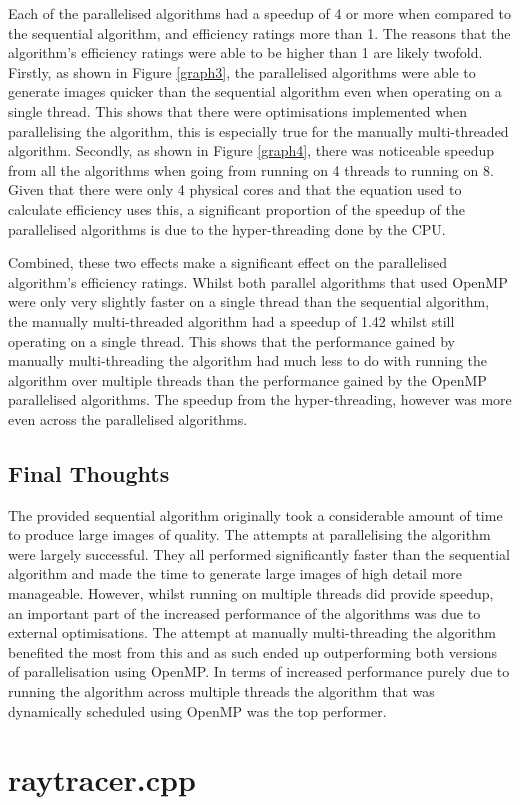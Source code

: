 \documentclass[12pt,journal,transmag]{IEEEtran}
\begin{document}
	Each of the parallelised algorithms had a speedup of 4 or more when compared to the sequential algorithm, and efficiency ratings more than 1. The reasons that the algorithm's efficiency ratings were able to be higher than 1 are likely twofold. Firstly, as shown in Figure \ref{graph3}, the parallelised algorithms were able to generate images quicker than the sequential algorithm even when operating on a single thread. This shows that there were optimisations implemented when parallelising the algorithm, this is especially true for the manually multi-threaded algorithm. Secondly, as shown in Figure \ref{graph4}, there was noticeable speedup from all the algorithms when going from running on 4 threads to running on 8. Given that there were only 4 physical cores and that the equation used to calculate efficiency uses this, a significant proportion of the speedup of the parallelised algorithms is due to the hyper-threading done by the CPU. 
	
	Combined, these two effects make a significant effect on the parallelised algorithm's efficiency ratings. Whilst both parallel algorithms that used OpenMP were only very slightly faster on a single thread than the sequential algorithm, the manually multi-threaded algorithm had a speedup of 1.42 whilst still operating on a single thread. This shows that the performance gained by manually multi-threading the algorithm had much less to do with running the algorithm over multiple threads than the performance gained by the OpenMP parallelised algorithms. The speedup from the hyper-threading, however was more even across the parallelised algorithms.
	
	\subsection{Final Thoughts}
	The provided sequential algorithm originally took a considerable amount of time to produce large images of quality. The attempts at parallelising the algorithm were largely successful. They all performed significantly faster than the sequential algorithm and made the time to generate large images of high detail more manageable. However, whilst running on multiple threads did provide speedup, an important part of the increased performance of the algorithms was due to external optimisations. The attempt at manually multi-threading the algorithm benefited the most from this and as such ended up outperforming both versions of parallelisation using OpenMP. In terms of increased performance purely due to running the algorithm across multiple threads the algorithm that was dynamically scheduled using OpenMP was the top performer.
	
	
	
	
	\newpage
	\onecolumn
	\appendices
	\section{raytracer.cpp}
	
	
\end{document}
